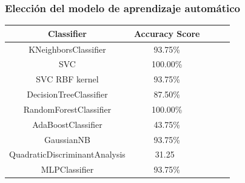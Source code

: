 \documentclass{beamer}
\begin{document}
\begin{frame}
\frametitle{Elección del modelo de aprendizaje automático}
\centering

\centering

\begin{table}[H]
\begin{center}
\begin{tabular}{|c|c|c|c|c|}
\hline
\textbf{Classifier} & \textbf{Accuracy Score}\\
\hline
KNeighborsClassifier & 93.75\%  \\  
SVC & 100.00\%  \\
SVC RBF kernel & 93.75\%  \\
DecisionTreeClassifier & 87.50\%  \\
RandomForestClassifier & 100.00\%  \\
AdaBoostClassifier & 43.75\%  \\
GaussianNB & 93.75\%  \\
QuadraticDiscriminantAnalysis & 31.25\  \\
MLPClassifier & 93.75\%  \\
\hline
\end{tabular}
\label{cuadro:tabla2}
\end{center}
\end{table}

\end{frame}
\end{document}
